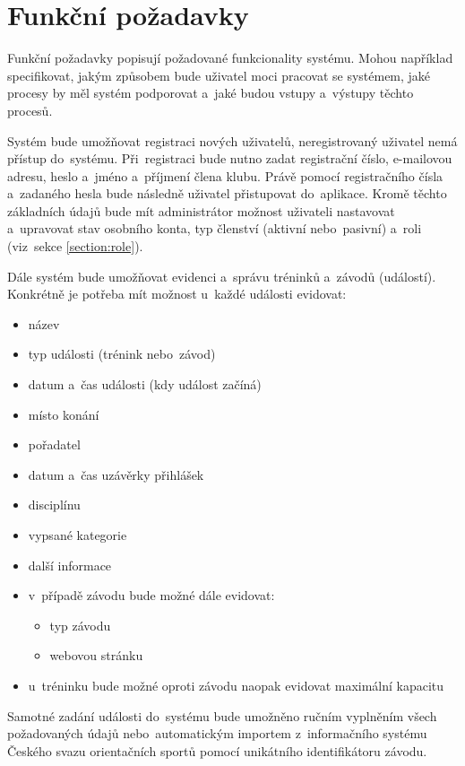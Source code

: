 \section{Funkční požadavky}
Funkční požadavky popisují požadované funkcionality systému. Mohou například specifikovat, jakým způsobem bude uživatel moci pracovat se systémem, jaké procesy by měl systém podporovat a~jaké budou vstupy a~výstupy těchto procesů. \cite{requirements}

\begin{enumerate}[label=\textcolor{decoration}{\textbf{F\arabic*}}, leftmargin=6mm]
	Systém bude umožňovat registraci nových uživatelů, neregistrovaný uživatel nemá přístup do~systému. Při~registraci bude nutno zadat registrační číslo, e-mailovou adresu, heslo a~jméno a~příjmení člena klubu. Právě pomocí registračního čísla a~zadaného hesla bude následně uživatel přistupovat do~aplikace. Kromě těchto základních údajů bude mít administrátor možnost uživateli nastavovat a~upravovat stav osobního konta, typ členství (aktivní nebo~pasivní) a~roli (viz~sekce \ref{section:role}).

	Dále systém bude umožňovat evidenci a~správu tréninků a~závodů (událostí). Konkrétně je potřeba mít možnost u~každé události evidovat:
	\begin{itemize}
		\item název
		\item typ události (trénink nebo~závod)
		\item datum a~čas události (kdy událost začíná)
		\item místo konání
		\item pořadatel
		\item datum a~čas uzávěrky přihlášek
		\item disciplínu
		\item vypsané kategorie
		\item další informace
		\item v~případě závodu bude možné dále evidovat:
		\begin{itemize}
			\item typ závodu
			\item webovou stránku
		\end{itemize}
		\item u~tréninku bude možné oproti závodu naopak evidovat maximální kapacitu
	\end{itemize}

	Samotné zadání události do~systému bude umožněno ručním vyplněním všech požadovaných údajů nebo~automatickým importem z~informačního systému Českého svazu orientačních sportů pomocí unikátního identifikátoru závodu.


\end{enumerate}
